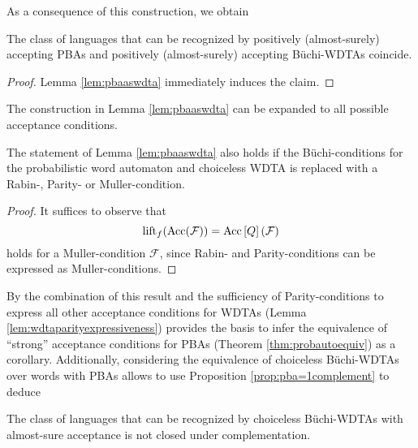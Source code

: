 As a consequence of this construction, we obtain
\begin{theorem}
  The class of languages that can be recognized by positively (almost-surely)
  accepting \acp{PBA} and positively (almost-surely) accepting Büchi-\acp{WDTA}
  coincide.
  \label{thm:pbaaswdta}
\end{theorem}
\begin{proof}
  Lemma \ref{lem:pbaaswdta} immediately induces the claim.
\end{proof}

The construction in Lemma \ref{lem:pbaaswdta} can be expanded to all possible
acceptance conditions.
\begin{corollary}
  The statement of Lemma \ref{lem:pbaaswdta} also holds if the Büchi-conditions
  for the probabilistic word automaton and choiceless \ac{WDTA} is replaced
  with a Rabin-, Parity- or Muller-condition.
\end{corollary}
\begin{proof}
  It suffices to observe that
  \begin{equation*}
    \operatorname{lift}_{f}(\operatorname{Acc}(\mathcal{F})) = \operatorname{Acc}\left[Q\right](\mathcal{F})
  \end{equation*}
  holds for a Muller-condition $\mathcal{F}$, since Rabin- and
  Parity-conditions can be expressed as Muller-conditions.
\end{proof}
By the combination of this result and the sufficiency of Parity-conditions to
express all other acceptance conditions for \acp{WDTA} (Lemma 
\ref{lem:wdtaparityexpressiveness}) provides the basis to infer the equivalence 
of \enquote{strong} acceptance conditions for \acp{PBA} (Theorem 
\ref{thm:probautoequiv}) as a corollary. Additionally, considering the 
equivalence of choiceless Büchi-\acp{WDTA} over words with \acp{PBA} allows to
use Proposition \ref{prop:pba=1complement} to deduce
\begin{proposition}
  The class of languages that can be recognized by choiceless Büchi-\acp{WDTA}
  with almost-sure acceptance is not closed under complementation.
\end{proposition}

